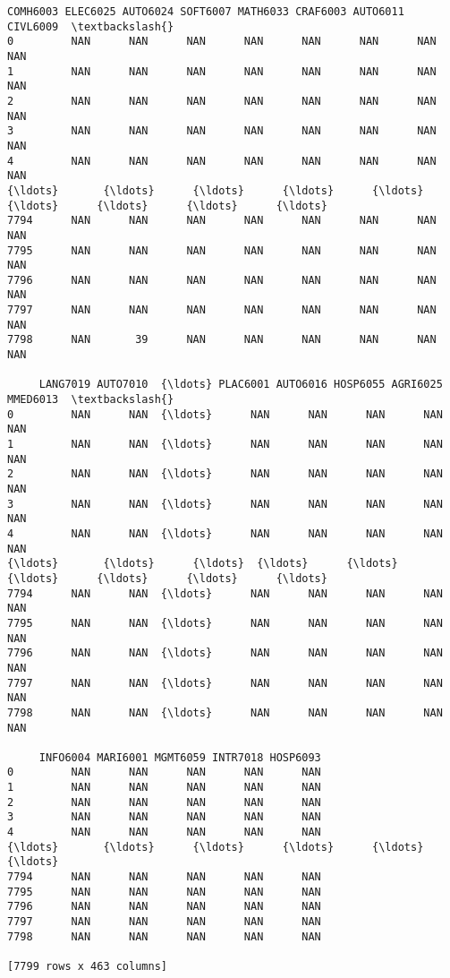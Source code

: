 \documentclass[11pt]{article}
\makeatletter
\newcommand{\boxspacing}{\kern\kvtcb@left@rule\kern\kvtcb@boxsep}
\newcommand{\prompt}[4]{
        \ttfamily\llap{{\color{#2}[#3]:\hspace{3pt}#4}}\vspace{-\baselineskip}
    }
\makeatother
\begin{document}
            \begin{tcolorbox}[breakable, size=fbox, boxrule=.5pt, pad at break*=1mm, opacityfill=0]
\prompt{Out}{outcolor}{17}{\boxspacing}
\begin{Verbatim}[commandchars=\\\{\}]
     COMH6003 ELEC6025 AUTO6024 SOFT6007 MATH6033 CRAF6003 AUTO6011 CIVL6009  \textbackslash{}
0         NAN      NAN      NAN      NAN      NAN      NAN      NAN      NAN
1         NAN      NAN      NAN      NAN      NAN      NAN      NAN      NAN
2         NAN      NAN      NAN      NAN      NAN      NAN      NAN      NAN
3         NAN      NAN      NAN      NAN      NAN      NAN      NAN      NAN
4         NAN      NAN      NAN      NAN      NAN      NAN      NAN      NAN
{\ldots}       {\ldots}      {\ldots}      {\ldots}      {\ldots}      {\ldots}      {\ldots}      {\ldots}      {\ldots}
7794      NAN      NAN      NAN      NAN      NAN      NAN      NAN      NAN
7795      NAN      NAN      NAN      NAN      NAN      NAN      NAN      NAN
7796      NAN      NAN      NAN      NAN      NAN      NAN      NAN      NAN
7797      NAN      NAN      NAN      NAN      NAN      NAN      NAN      NAN
7798      NAN       39      NAN      NAN      NAN      NAN      NAN      NAN

     LANG7019 AUTO7010  {\ldots} PLAC6001 AUTO6016 HOSP6055 AGRI6025 MMED6013  \textbackslash{}
0         NAN      NAN  {\ldots}      NAN      NAN      NAN      NAN      NAN
1         NAN      NAN  {\ldots}      NAN      NAN      NAN      NAN      NAN
2         NAN      NAN  {\ldots}      NAN      NAN      NAN      NAN      NAN
3         NAN      NAN  {\ldots}      NAN      NAN      NAN      NAN      NAN
4         NAN      NAN  {\ldots}      NAN      NAN      NAN      NAN      NAN
{\ldots}       {\ldots}      {\ldots}  {\ldots}      {\ldots}      {\ldots}      {\ldots}      {\ldots}      {\ldots}
7794      NAN      NAN  {\ldots}      NAN      NAN      NAN      NAN      NAN
7795      NAN      NAN  {\ldots}      NAN      NAN      NAN      NAN      NAN
7796      NAN      NAN  {\ldots}      NAN      NAN      NAN      NAN      NAN
7797      NAN      NAN  {\ldots}      NAN      NAN      NAN      NAN      NAN
7798      NAN      NAN  {\ldots}      NAN      NAN      NAN      NAN      NAN

     INFO6004 MARI6001 MGMT6059 INTR7018 HOSP6093
0         NAN      NAN      NAN      NAN      NAN
1         NAN      NAN      NAN      NAN      NAN
2         NAN      NAN      NAN      NAN      NAN
3         NAN      NAN      NAN      NAN      NAN
4         NAN      NAN      NAN      NAN      NAN
{\ldots}       {\ldots}      {\ldots}      {\ldots}      {\ldots}      {\ldots}
7794      NAN      NAN      NAN      NAN      NAN
7795      NAN      NAN      NAN      NAN      NAN
7796      NAN      NAN      NAN      NAN      NAN
7797      NAN      NAN      NAN      NAN      NAN
7798      NAN      NAN      NAN      NAN      NAN

[7799 rows x 463 columns]
\end{Verbatim}
\end{tcolorbox}
        
\end{document}
